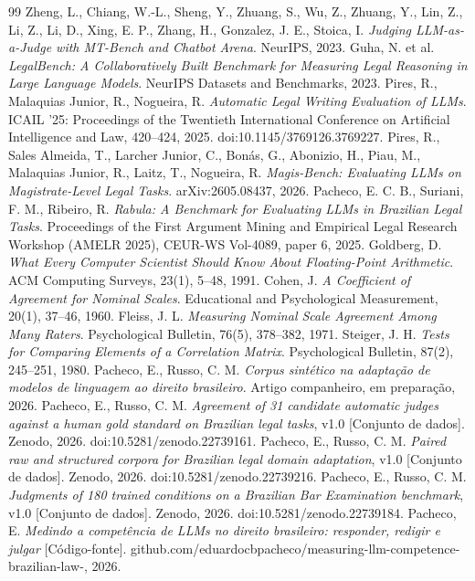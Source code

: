 \documentclass{IOS-Book-Article}
\begin{document}
\begin{thebibliography}{99}
 Zheng, L., Chiang, W.-L., Sheng, Y., Zhuang, S., Wu, Z., Zhuang, Y., Lin, Z., Li, Z., Li, D., Xing, E. P., Zhang, H., Gonzalez, J. E., Stoica, I. \emph{Judging LLM-as-a-Judge with MT-Bench and Chatbot Arena}. NeurIPS, 2023.
 Guha, N. et al. \emph{LegalBench: A Collaboratively Built Benchmark for Measuring Legal Reasoning in Large Language Models}. NeurIPS Datasets and Benchmarks, 2023.
 Pires, R., Malaquias Junior, R., Nogueira, R. \emph{Automatic Legal Writing Evaluation of LLMs}. ICAIL '25: Proceedings of the Twentieth International Conference on Artificial Intelligence and Law, 420--424, 2025. doi:10.1145/3769126.3769227.
 Pires, R., Sales Almeida, T., Larcher Junior, C., Bonás, G., Abonizio, H., Piau, M., Malaquias Junior, R., Laitz, T., Nogueira, R. \emph{Magis-Bench: Evaluating LLMs on Magistrate-Level Legal Tasks}. arXiv:2605.08437, 2026.
 Pacheco, E. C. B., Suriani, F. M., Ribeiro, R. \emph{Rabula: A Benchmark for Evaluating LLMs in Brazilian Legal Tasks}. Proceedings of the First Argument Mining and Empirical Legal Research Workshop (AMELR 2025), CEUR-WS Vol-4089, paper 6, 2025.
 Goldberg, D. \emph{What Every Computer Scientist Should Know About Floating-Point Arithmetic}. ACM Computing Surveys, 23(1), 5--48, 1991.
 Cohen, J. \emph{A Coefficient of Agreement for Nominal Scales}. Educational and Psychological Measurement, 20(1), 37--46, 1960.
 Fleiss, J. L. \emph{Measuring Nominal Scale Agreement Among Many Raters}. Psychological Bulletin, 76(5), 378--382, 1971.
 Steiger, J. H. \emph{Tests for Comparing Elements of a Correlation Matrix}. Psychological Bulletin, 87(2), 245--251, 1980.
 Pacheco, E., Russo, C. M. \emph{Corpus sintético na adaptação de modelos de linguagem ao direito brasileiro}. Artigo companheiro, em preparação, 2026.
 Pacheco, E., Russo, C. M. \emph{Agreement of 31 candidate automatic judges against a human gold standard on Brazilian legal tasks}, v1.0 [Conjunto de dados]. Zenodo, 2026. doi:10.5281/zenodo.22739161.
 Pacheco, E., Russo, C. M. \emph{Paired raw and structured corpora for Brazilian legal domain adaptation}, v1.0 [Conjunto de dados]. Zenodo, 2026. doi:10.5281/zenodo.22739216.
 Pacheco, E., Russo, C. M. \emph{Judgments of 180 trained conditions on a Brazilian Bar Examination benchmark}, v1.0 [Conjunto de dados]. Zenodo, 2026. doi:10.5281/zenodo.22739184.
 Pacheco, E. \emph{Medindo a competência de LLMs no direito brasileiro: responder, redigir e julgar} [Código-fonte]. github.com/eduardocbpacheco/measuring-llm-competence-brazilian-law-, 2026.

\end{thebibliography}
\end{document}
